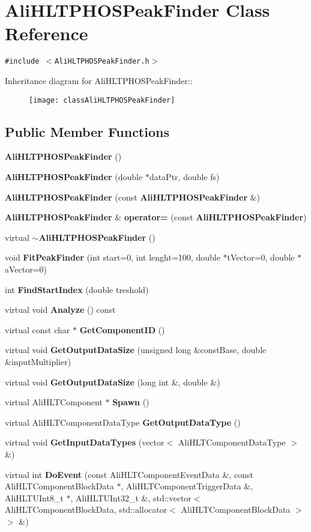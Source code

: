 \section{Ali\-HLTPHOSPeak\-Finder Class Reference}
\label{classAliHLTPHOSPeakFinder}
{\tt \#include $<$Ali\-HLTPHOSPeak\-Finder.h$>$}

Inheritance diagram for Ali\-HLTPHOSPeak\-Finder::\begin{figure}[H]
\begin{center}
\leavevmode
\texttt{[image: classAliHLTPHOSPeakFinder]}
\end{center}
\end{figure}
\subsection*{Public Member Functions}
\begin{CompactItemize}
\item 
{\bf Ali\-HLTPHOSPeak\-Finder} ()
\item 
{\bf Ali\-HLTPHOSPeak\-Finder} (double $\ast$data\-Ptr, double fs)
\item 
{\bf Ali\-HLTPHOSPeak\-Finder} (const {\bf Ali\-HLTPHOSPeak\-Finder} \&)
\item 
{\bf Ali\-HLTPHOSPeak\-Finder} \& {\bf operator=} (const {\bf Ali\-HLTPHOSPeak\-Finder})
\item 
virtual {\bf $\sim$Ali\-HLTPHOSPeak\-Finder} ()
\item 
void {\bf Fit\-Peak\-Finder} (int start=0, int lenght=100, double $\ast$t\-Vector=0, double $\ast$a\-Vector=0)
\item 
int {\bf Find\-Start\-Index} (double treshold)
\item 
virtual void {\bf Analyze} () const 
\item 
virtual const char $\ast$ {\bf Get\-Component\-ID} ()
\item 
virtual void {\bf Get\-Output\-Data\-Size} (unsigned long \&const\-Base, double \&input\-Multiplier)
\item 
virtual void {\bf Get\-Output\-Data\-Size} (long int \&, double \&)
\item 
virtual Ali\-HLTComponent $\ast$ {\bf Spawn} ()
\item 
virtual Ali\-HLTComponent\-Data\-Type {\bf Get\-Output\-Data\-Type} ()
\item 
virtual void {\bf Get\-Input\-Data\-Types} (vector$<$ Ali\-HLTComponent\-Data\-Type $>$ \&)
\item 
virtual int {\bf Do\-Event} (const Ali\-HLTComponent\-Event\-Data \&, const Ali\-HLTComponent\-Block\-Data $\ast$, Ali\-HLTComponent\-Trigger\-Data \&, Ali\-HLTUInt8\_\-t $\ast$, Ali\-HLTUInt32\_\-t \&, std::vector$<$ Ali\-HLTComponent\-Block\-Data, std::allocator$<$ Ali\-HLTComponent\-Block\-Data $>$ $>$ \&)
\end{CompactItemize}
